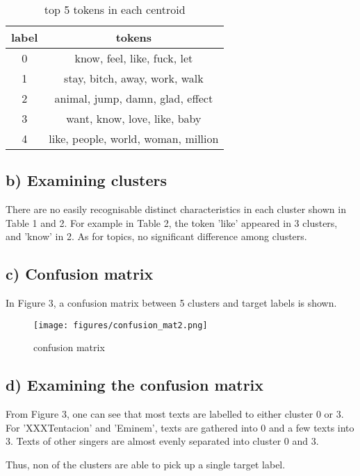 \documentclass[a4paper,11pt]{article}
\begin{document}
\begin{table}[htb]

  \begin{center}
  \caption{top 5 tokens in each centroid}

  \begin{tabular}{|c|c|} 
    label & tokens\\ \hline \hline
    0 & know, feel, like, fuck, let \\ \hline
    1 & stay, bitch, away, work, walk\\ \hline
    2 & animal, jump, damn, glad, effect\\ \hline
    3 & want, know, love, like, baby\\ \hline
    4 & like, people, world, woman, million\\ \hline
  \end{tabular}
  \end{center}
\end{table}


\subsection{b) Examining clusters}
There are no easily recognisable distinct characteristics in each cluster shown in Table 1 and 2.
For example in Table 2, the token 'like' appeared in 3 clusters, and 'know' in 2.
As for topics, no significant difference among clusters.
\subsection{c) Confusion matrix}
In Figure 3, a confusion matrix between 5 clusters and target labels is shown.

\begin{figure}[htbp]
  \begin{center}
  \texttt{[image: figures/confusion\_mat2.png]}
  \caption{confusion matrix}
  \end{center}
\end{figure}
\subsection{d) Examining the confusion matrix}
From Figure 3, one can see that most texts are labelled to either cluster 0 or 3. 
For 'XXXTentacion' and 'Eminem', texts are gathered into 0 and a few texts into 3.
Texts of other singers are almost evenly separated into cluster 0 and 3.

Thus, non of the clusters are able to pick up a single target label.
\end{document}
